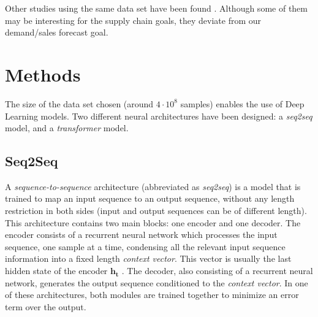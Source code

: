 \documentclass{elsarticle}
\begin{document}
	Other studies using the same data set have been found  \cite{Wang2020, Shaikhha2020, Schleich2019, Lim2019, Curtin2020, Malik2019, Kuleshov2018, Khamis2020}. Although some of them may be interesting for the supply chain goals, they deviate from our demand/sales forecast goal.
	
	\section{Methods} \label{sec:methods}
	The size of the data set chosen (around $4\cdot10^8$ samples) enables the use of Deep Learning models. Two different neural architectures have been designed: a \textit{seq2seq} model, and a \textit{transformer} model.
	
	\subsection{Seq2Seq}  %
	A \textit{sequence-to-sequence} architecture (abbreviated as \textit{seq2seq}) \cite{sutskever2014} is a model that is trained to map an input sequence to an output sequence, without any length restriction in both sides (input and output sequences can be of different length). This architecture contains two main blocks: one encoder and one decoder. The encoder consists of a recurrent neural network which processes the input sequence, one sample at a time, condensing all the relevant input sequence information into a fixed length \textit{context vector}. This vector is usually the last hidden state of the encoder $\mathbf{h_t}$ \cite{kamath2019}. The decoder, also consisting of a recurrent neural network, generates the output sequence conditioned to the \textit{context vector}. In one of these architectures, both modules are trained together to minimize an error term over the output.
	 
\end{document}
